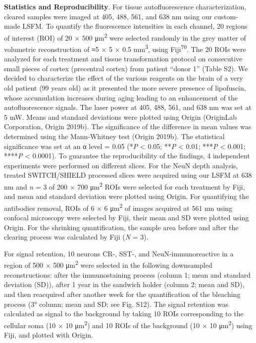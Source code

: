 \documentclass{article}
\begin{document}
\textbf{Statistics and Reproducibility}. For tissue autofluorescence characterization, cleared samples were imaged at 405, 488, 561, and 638 nm using our custom-made LSFM. To quantify the fluorescence intensities in each channel, 20 regions of interest (ROI) of 20 × 500 μm\textsuperscript{2} were selected randomly in the grey matter of volumetric reconstruction of ≈5 × 5 × 0.5 mm\textsuperscript{3}, using Fiji\textsuperscript{70}. The 20 ROIs were analyzed for each treatment and tissue transformation protocol on consecutive small pieces of cortex (precentral cortex) from patient “donor 1” (Table S2). We decided to characterize the effect of the various reagents on the brain of a very old patient (99 years old) as it presented the more severe presence of lipofuscin, whose accumulation increases during aging leading to an enhancement of the autofluorescence signals. The laser power at 405, 488, 561, and 638 nm was set at 5 mW. Means and standard deviations were plotted using Origin (OriginLab Corporation, Origin 2019b). The significance of the difference in mean values was determined using the Mann-Whitney test (Origin 2019b). The statistical significance was set at an α level = 0.05 (*\emph{P} < 0.05; **\emph{P} < 0.01; ***\emph{P} < 0.001; ****\emph{P} < 0.0001). To guarantee the reproducibility of the findings, 4 independent experiments were performed on different slices. For the NeuN depth analysis, treated SWITCH/SHIELD processed slices were acquired using our LSFM at 638 nm and \emph{n} = 3 of 200 × 700 μm\textsuperscript{2} ROIs were selected for each treatment by Fiji, and mean and standard deviation were plotted using Origin. For quantifying the antibodies removal, ROIs of 6 × 6 μm\textsuperscript{2} of images acquired at 561 nm using confocal microscopy were selected by Fiji, their mean and SD were plotted using Origin. For the shrinking quantification, the sample area before and after the clearing process was calculated by Fiji (\emph{N} = 3).

For signal retention, 10 neurons CR-, SST-, and NeuN-immunoreactive in a region of 500 × 500 μm\textsuperscript{2} were selected in the following downsampled reconstructions: after the immunostaining process (column 1; mean and standard deviation (SD)), after 1 year in the sandwich holder (column 2; mean and SD), and then reacquired after another week for the quantification of the bleaching process (3° column; mean and SD; see Fig. S12). The signal retention was calculated as signal to the background by taking 10 ROIs corresponding to the cellular soma (10 × 10 μm\textsuperscript{2}) and 10 ROIs of the background (10 × 10 μm\textsuperscript{2}) using Fiji, and plotted with Origin.
\end{document}
